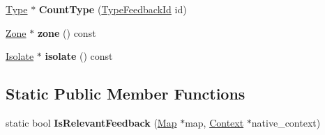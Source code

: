 \begin{DoxyCompactItemize}
\item 
\hyperlink{classv8_1_1internal_1_1_type}{Type} $\ast$ {\bfseries Count\+Type} (\hyperlink{classv8_1_1internal_1_1_type_feedback_id}{Type\+Feedback\+Id} id)\hypertarget{classv8_1_1internal_1_1_type_feedback_oracle_ae2d2bada2c837f24efd9d10acfb61d68}{}\label{classv8_1_1internal_1_1_type_feedback_oracle_ae2d2bada2c837f24efd9d10acfb61d68}

\item 
\hyperlink{classv8_1_1internal_1_1_zone}{Zone} $\ast$ {\bfseries zone} () const \hypertarget{classv8_1_1internal_1_1_type_feedback_oracle_a700251044fa557f3c4af2ee2fc415802}{}\label{classv8_1_1internal_1_1_type_feedback_oracle_a700251044fa557f3c4af2ee2fc415802}

\item 
\hyperlink{classv8_1_1internal_1_1_isolate}{Isolate} $\ast$ {\bfseries isolate} () const \hypertarget{classv8_1_1internal_1_1_type_feedback_oracle_abc3aa56ede67a173d4e5e5f2ba4c5f12}{}\label{classv8_1_1internal_1_1_type_feedback_oracle_abc3aa56ede67a173d4e5e5f2ba4c5f12}

\end{DoxyCompactItemize}
\subsection*{Static Public Member Functions}
\begin{DoxyCompactItemize}
\item 
static bool {\bfseries Is\+Relevant\+Feedback} (\hyperlink{classv8_1_1internal_1_1_map}{Map} $\ast$map, \hyperlink{classv8_1_1internal_1_1_context}{Context} $\ast$native\+\_\+context)\hypertarget{classv8_1_1internal_1_1_type_feedback_oracle_a54f51df94ba7a5f9732eaa5da31360c9}{}\label{classv8_1_1internal_1_1_type_feedback_oracle_a54f51df94ba7a5f9732eaa5da31360c9}

\end{DoxyCompactItemize}

